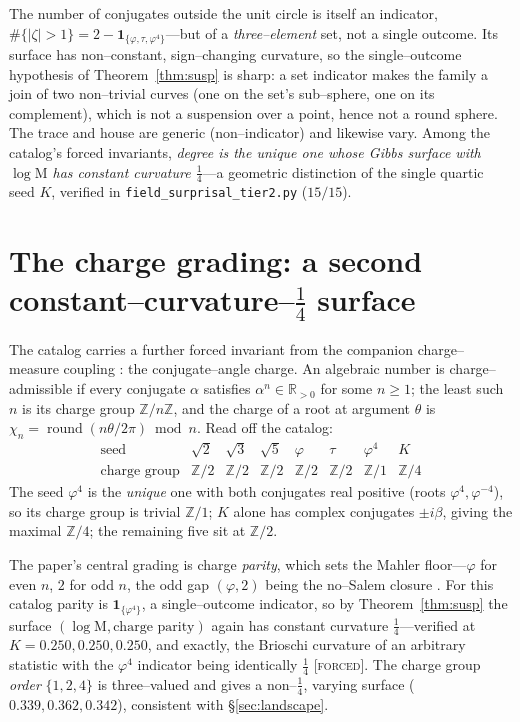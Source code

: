 \documentclass[11pt]{article}
\theoremstyle{definition}
\newcommand{\ph}{\varphi}
\newcommand{\R}{\mathbb{R}}
\newcommand{\Z}{\mathbb{Z}}
\newcommand{\Mah}{\mathrm{M}}
\newcommand{\forcedtag}{{\scshape [forced]}}
\begin{document}
The number of conjugates outside the unit circle is itself an indicator, $\#\{|\zeta|>1\}
=2-\mathbf 1_{\{\ph,\tau,\ph^4\}}$---but of a \emph{three--element} set, not a single outcome. Its
surface has non--constant, sign--changing curvature, so the single--outcome hypothesis of
Theorem~\ref{thm:susp} is sharp: a set indicator makes the family a join of two non--trivial curves
(one on the set's sub--sphere, one on its complement), which is not a suspension over a point, hence
not a round sphere. The trace and house are generic (non--indicator) and likewise vary. Among the
catalog's forced invariants, \emph{degree is the unique one whose Gibbs surface with $\log\Mah$ has
constant curvature $\tfrac14$}---a geometric distinction of the single quartic seed $K$, verified in
\texttt{field\_surprisal\_tier2.py} ($15/15$).

\section{The charge grading: a second constant--curvature--$\tfrac14$ surface}\label{sec:charge}
The catalog carries a further forced invariant from the companion charge--measure coupling
\cite{cmc}: the conjugate--angle charge. An algebraic number is charge--admissible if every conjugate
$\alpha$ satisfies $\alpha^n\in\R_{>0}$ for some $n\ge1$; the least such $n$ is its charge group
$\Z/n\Z$, and the charge of a root at argument $\theta$ is $\chi_n=\operatorname{round}(n\theta/2\pi)
\bmod n$. Read off the catalog:
\[
\begin{array}{lccccccc}
\text{seed} & \sqrt2 & \sqrt3 & \sqrt5 & \ph & \tau & \ph^4 & K\\[1pt]
\text{charge group} & \Z/2 & \Z/2 & \Z/2 & \Z/2 & \Z/2 & \Z/1 & \Z/4
\end{array}
\]
The seed $\ph^4$ is the \emph{unique} one with both conjugates real positive (roots $\ph^4,\ph^{-4}$),
so its charge group is trivial $\Z/1$; $K$ alone has complex conjugates $\pm i\beta$, giving the
maximal $\Z/4$; the remaining five sit at $\Z/2$.

The paper's central grading is charge \emph{parity}, which sets the Mahler floor---$\ph$ for even $n$,
$2$ for odd $n$, the odd gap $(\ph,2)$ being the no--Salem closure \cite[Thm.~5.1, 6.2]{cmc}. For this
catalog parity is $\mathbf 1_{\{\ph^4\}}$, a single--outcome indicator, so by Theorem~\ref{thm:susp}
the surface $(\log\Mah,\text{charge parity})$ again has constant curvature $\tfrac14$---verified
at $K=0.250,0.250,0.250$, and exactly, the Brioschi curvature of an arbitrary statistic with the
$\ph^4$ indicator being identically $\tfrac14$ \forcedtag. The charge group \emph{order}
$\{1,2,4\}$ is three--valued and gives a non--$\tfrac14$, varying surface ($0.339,0.362,0.342$),
consistent with \S\ref{sec:landscape}.
\end{document}
